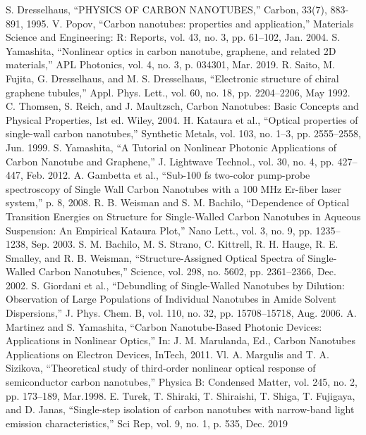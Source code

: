 \begin{thebibliography}{99}
 S. Dresselhaus, “PHYSICS OF CARBON NANOTUBES,” Carbon, 33(7), 883-891, 1995.
 V. Popov, “Carbon nanotubes: properties and application,” Materials Science and Engineering: R: Reports, vol. 43, no. 3, pp. 61–102, Jan. 2004.
 S. Yamashita, “Nonlinear optics in carbon nanotube, graphene, and related 2D materials,” APL Photonics, vol. 4, no. 3, p. 034301, Mar. 2019.
R. Saito, M. Fujita, G. Dresselhaus, and M. S. Dresselhaus, “Electronic structure of chiral graphene tubules,” Appl. Phys. Lett., vol. 60, no. 18, pp. 2204–2206, May 1992.
C. Thomsen, S. Reich, and J. Maultzsch, Carbon Nanotubes: Basic Concepts and Physical Properties, 1st ed. Wiley, 2004. 
 H. Kataura et al., “Optical properties of single-wall carbon nanotubes,” Synthetic Metals, vol. 103, no. 1–3, pp. 2555–2558, Jun. 1999.
 S. Yamashita, “A Tutorial on Nonlinear Photonic Applications of Carbon Nanotube and Graphene,” J. Lightwave Technol., vol. 30, no. 4, pp. 427–447, Feb. 2012.
A. Gambetta et al., “Sub-100 fs two-color pump-probe spectroscopy of Single Wall Carbon Nanotubes with a 100 MHz Er-fiber laser system,” p. 8, 2008.
 R. B. Weisman and S. M. Bachilo, “Dependence of Optical Transition Energies on Structure for Single-Walled Carbon Nanotubes in Aqueous Suspension: An Empirical Kataura Plot,” Nano Lett., vol. 3, no. 9, pp. 1235–1238, Sep. 2003.
 S. M. Bachilo, M. S. Strano, C. Kittrell, R. H. Hauge, R. E. Smalley, and R. B. Weisman, “Structure-Assigned Optical Spectra of Single-Walled Carbon Nanotubes,” Science, vol. 298, no. 5602, pp. 2361–2366, Dec. 2002. 
S. Giordani et al., “Debundling of Single-Walled Nanotubes by Dilution: Observation of Large Populations of Individual Nanotubes in Amide Solvent Dispersions,” J. Phys. Chem. B, vol. 110, no. 32, pp. 15708–15718, Aug. 2006.
 A. Martinez and S. Yamashita, “Carbon Nanotube-Based Photonic Devices: Applications in Nonlinear Optics,” In: J. M. Marulanda, Ed., Carbon Nanotubes Applications on Electron Devices, InTech, 2011. 
 Vl. A. Margulis and T. A. Sizikova, “Theoretical study of third-order nonlinear optical response of semiconductor carbon nanotubes,” Physica B: Condensed Matter, vol. 245, no. 2, pp. 173–189, Mar.1998.
 E. Turek, T. Shiraki, T. Shiraishi, T. Shiga, T. Fujigaya, and D. Janas, “Single-step isolation of carbon nanotubes with narrow-band light emission characteristics,” Sci Rep, vol. 9, no. 1, p. 535, Dec. 2019


\end{thebibliography}
